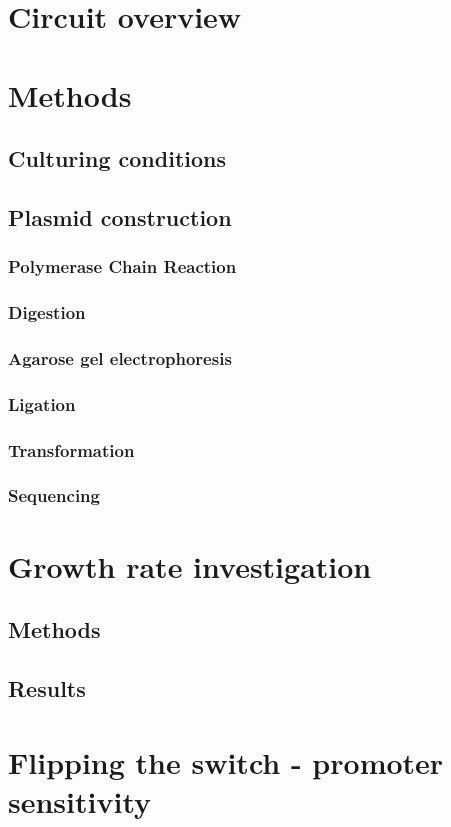 \section{Circuit overview}
\section{Methods}
\subsection{Culturing conditions}
\subsection{Plasmid construction}
\subsubsection{Polymerase Chain Reaction}
\subsubsection{Digestion}
\subsubsection{Agarose gel electrophoresis}
\subsubsection{Ligation}
\subsubsection{Transformation}
\subsubsection{Sequencing}




\section{Growth rate investigation}
\subsection{Methods}
\subsection{Results}

\section{Flipping the switch - promoter sensitivity}
